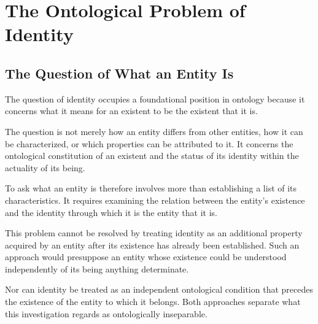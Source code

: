 %
%
%
%


\section{The Ontological Problem of Identity}
\label{sec:ontological-problem-of-identity}



\subsection{The Question of What an Entity Is}

The question of identity occupies a foundational
position in ontology because it concerns what it
means for an existent to be the existent that it is.

The question is not merely how an entity differs
from other entities, how it can be characterized,
or which properties can be attributed to it.
It concerns the ontological constitution of an
existent and the status of its identity within
the actuality of its being.

To ask what an entity is therefore involves more
than establishing a list of its characteristics.
It requires examining the relation between the
entity's existence and the identity through which
it is the entity that it is.

This problem cannot be resolved by treating identity
as an additional property acquired by an entity
after its existence has already been established.
Such an approach would presuppose an entity whose
existence could be understood independently of
its being anything determinate.

Nor can identity be treated as an independent
ontological condition that precedes the existence
of the entity to which it belongs. Both approaches
separate what this investigation regards as
ontologically inseparable.

